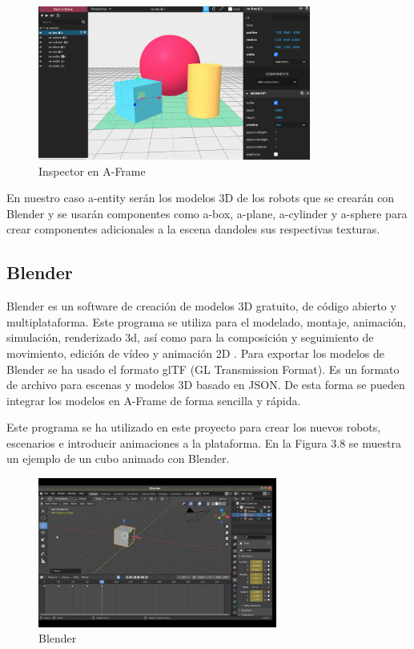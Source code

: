 \begin{figure}[H]
    \centering
    \includegraphics[width=0.8\textwidth, height=0.5\textwidth]{chapters/images/inspectoraframe.png}
    \caption{Inspector en A-Frame}
    \label{fig:my_label}
\end{figure}


En nuestro caso a-entity serán los modelos 3D de los robots que se crearán con Blender  y se usarán componentes como a-box, a-plane, a-cylinder y a-sphere para crear componentes adicionales a la escena dandoles sus respectivas texturas.

\subsection{Blender}
Blender es un software de creación de modelos 3D gratuito, de código abierto y multiplataforma. Este programa se utiliza para el modelado, montaje, animación, simulación, renderizado 3d, así como para la  composición y seguimiento de movimiento, edición de vídeo y animación 2D
\cite{blender}.
Para exportar los modelos de Blender se ha usado el formato glTF (GL Transmission Format). Es un formato de archivo para escenas y modelos 3D basado en JSON. De esta forma se pueden integrar los modelos en A-Frame de forma sencilla y rápida.

Este programa se ha utilizado en este proyecto para crear los nuevos robots, escenarios e introducir animaciones a la plataforma. En la Figura 3.8 se muestra un ejemplo de un cubo animado con Blender.

\begin{figure}[H]
    \centering
    \includegraphics[width=0.7\textwidth, height=0.4\textwidth]{chapters/images/blender.png}
    \caption{Blender}
    \label{fig:my_label}
\end{figure}

